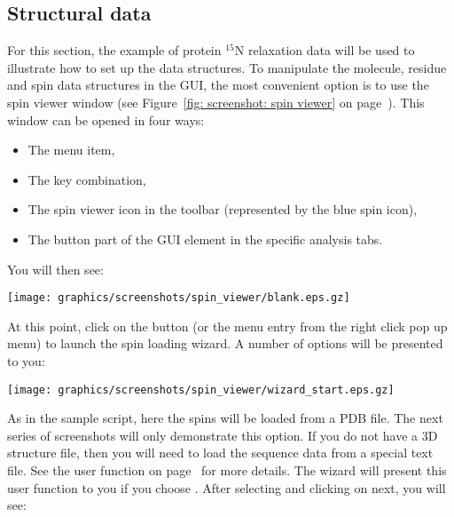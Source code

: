 \subsection{Structural data} \label{sect: GUI - structural data}

For this section, the example of protein $^{15}$N relaxation data will be used to illustrate how to set up the data structures.  To manipulate the molecule, residue and spin data structures in the GUI, the most convenient option is to use the spin viewer window (see Figure~\ref{fig: screenshot: spin viewer} on page~\pageref{fig: screenshot: spin viewer}).  This window can be opened in four ways:

\begin{itemize}
\item The  menu item,
\item The  key combination,
\item The spin viewer icon in the toolbar (represented by the blue spin icon),
\item The  button part of the  GUI element in the specific analysis tabs.
\end{itemize}

You will then see:

\begin{minipage}[h]{\linewidth}
\centerline{\texttt{[image: graphics/screenshots/spin\_viewer/blank.eps.gz]}}
\label{figure: spin viewer blank}
\end{minipage}

At this point, click on the  button (or the  menu entry from the right click pop up menu) to launch the spin loading wizard.  A number of options will be presented to you: 

\begin{minipage}[h]{\linewidth}
\centerline{\texttt{[image: graphics/screenshots/spin\_viewer/wizard\_start.eps.gz]}}
\label{figure: spin viewer wizard start}
\end{minipage}

As in the sample script, here the spins will be loaded from a PDB file.  The next series of screenshots will only demonstrate this option.  If you do not have a 3D structure file, then you will need to load the sequence data from a special text file.  See the  user function on page~\pageref{uf: sequence.read} for more details.  The wizard will present this user function to you if you choose .  After selecting  and clicking on next, you will see:

